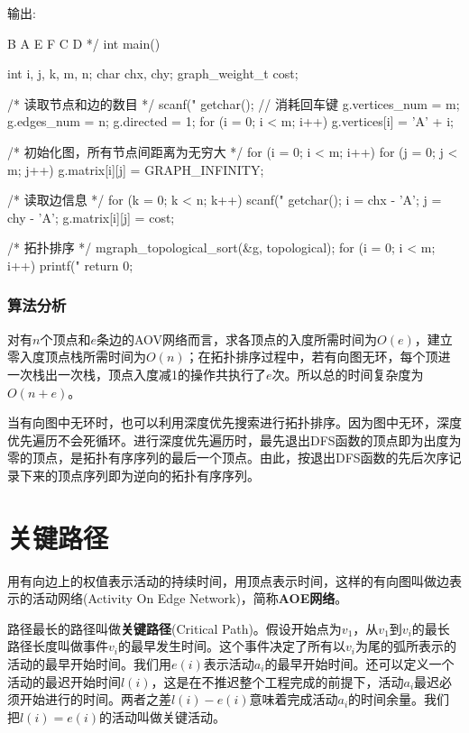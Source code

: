 \begin{Codex}[label=mgraph_topological_sort.c]
输出:

B A E F C D
*/
int main() {
    int i, j, k, m, n;
    char chx, chy;
    graph_weight_t cost;

    /* 读取节点和边的数目 */
    scanf("%
    getchar(); // 消耗回车键
    g.vertices_num = m;
    g.edges_num = n;
    g.directed = 1;
    for (i = 0; i < m; i++) g.vertices[i] = 'A' + i;

    /* 初始化图，所有节点间距离为无穷大 */
    for (i = 0; i < m; i++) {
        for (j = 0; j < m; j++) {
            g.matrix[i][j] = GRAPH_INFINITY;
        }
    }

    /* 读取边信息 */
    for (k = 0; k < n; k++) {
        scanf("%
        getchar();
        i = chx - 'A';
        j = chy - 'A';
        g.matrix[i][j] = cost;
    }

    /* 拓扑排序 */
    mgraph_topological_sort(&g, topological);
    for (i = 0; i < m; i++) {
        printf("%
    }
    return 0;
}
\end{Codex}

\subsubsection{算法分析}
对有$n$个顶点和$e$条边的AOV网络而言，求各顶点的入度所需时间为$O(e)$，建立零入度顶点栈所需时间为$O(n)$；在拓扑排序过程中，若有向图无环，每个顶进一次栈出一次栈，顶点入度减1的操作共执行了$e$次。所以总的时间复杂度为$O(n+e)$。

当有向图中无环时，也可以利用深度优先搜索进行拓扑排序。因为图中无环，深度优先遍历不会死循环。进行深度优先遍历时，最先退出DFS函数的顶点即为出度为零的顶点，是拓扑有序序列的最后一个顶点。由此，按退出DFS函数的先后次序记录下来的顶点序列即为逆向的拓扑有序序列。

	
\section{关键路径} %
用有向边上的权值表示活动的持续时间，用顶点表示时间，这样的有向图叫做边表示的活动网络(Activity On Edge Network)，简称\textbf{AOE网络}。

路径最长的路径叫做\textbf{关键路径}(Critical Path)。假设开始点为$v_1$，从$v_1$到$v_i$的最长路径长度叫做事件$v_i$的最早发生时间。这个事件决定了所有以$v_i$为尾的弧所表示的活动的最早开始时间。我们用$e(i)$表示活动$a_i$的最早开始时间。还可以定义一个活动的最迟开始时间$l(i)$，这是在不推迟整个工程完成的前提下，活动$a_i$最迟必须开始进行的时间。两者之差$l(i)-e(i)$意味着完成活动$a_i$的时间余量。我们把$l(i)=e(i)$的活动叫做关键活动。

